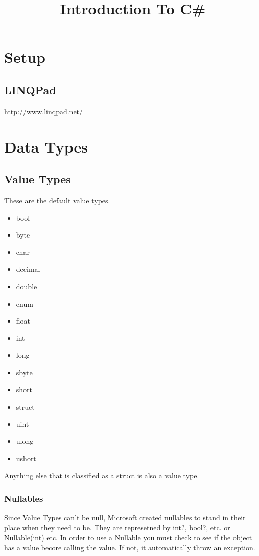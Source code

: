 \documentclass {amsart}
\title{Introduction To C\#}
\begin{document}
\maketitle


\section{Setup}
	\subsection{LINQPad}
		\url{http://www.linqpad.net/}

\section{Data Types}
	\subsection{Value Types}  These are the default value types. 
		\begin{itemize}
			\item bool
			\item byte
			\item char
			\item decimal
			\item double
			\item enum
			\item float
			\item int
			\item long
			\item sbyte
			\item short
			\item struct
			\item uint
			\item ulong
			\item ushort
		\end{itemize}

		Anything else that is classified as a struct is also a value type. 

		\subsubsection{Nullables} Since Value Types can't be null, Microsoft created nullables to stand in their place when they need to be.  They are represetned by int?, bool?, etc. or Nullable(int) etc.  In order to use a Nullable you must check to see if the object has a value becore calling the value.  If not, it automatically throw an exception.
\end{document}
